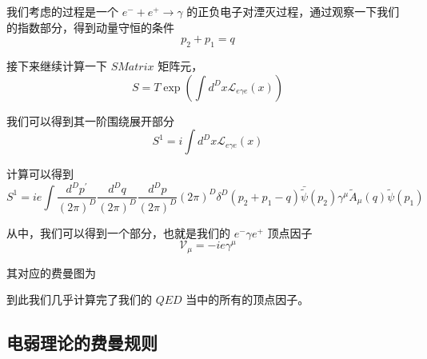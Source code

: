 \documentclass{article}
\begin{document}
我们考虑的过程是一个 $e^{-} + e^{+} \to \gamma$ 的正负电子对湮灭过程，通过观察一下我们的指数部分，得到动量守恒的条件
\begin{equation*}
    p_2 + p_1 = q
\end{equation*}

接下来继续计算一下 $S Matrix$ 矩阵元，
\begin{equation}
    S = T \exp\left(\int d^D x \mathcal{L}_{e\gamma e}(x)\right)
\end{equation}

我们可以得到其一阶围绕展开部分
\begin{equation*}
    S^{1} = i \int d^D x \mathcal{L}_{e\gamma e}(x)
\end{equation*}

计算可以得到
\begin{equation*}
    S^{1} = i e\int \frac{d^D p^\prime}{(2\pi)^D} \frac{d^D q}{(2\pi)^D} \frac{d^D p}{(2\pi)^D} (2\pi)^{D} \delta^{D}(p_2 + p_1 - q) \bar{\tilde{\psi}}(p_2)\gamma^{\mu}\tilde{A}_{\mu}(q)\tilde{\psi}(p_1)
\end{equation*}

从中，我们可以得到一个部分，也就是我们的 $e^{-}\gamma e^{+}$ 顶点因子 
\begin{equation}
    \mathcal{V}_{\mu} = -ie\gamma^{\mu}
\end{equation}

其对应的费曼图为
\begin{center}
\end{center}

到此我们几乎计算完了我们的 $QED$ 当中的所有的顶点因子。








\subsection{电弱理论的费曼规则}
\end{document}

